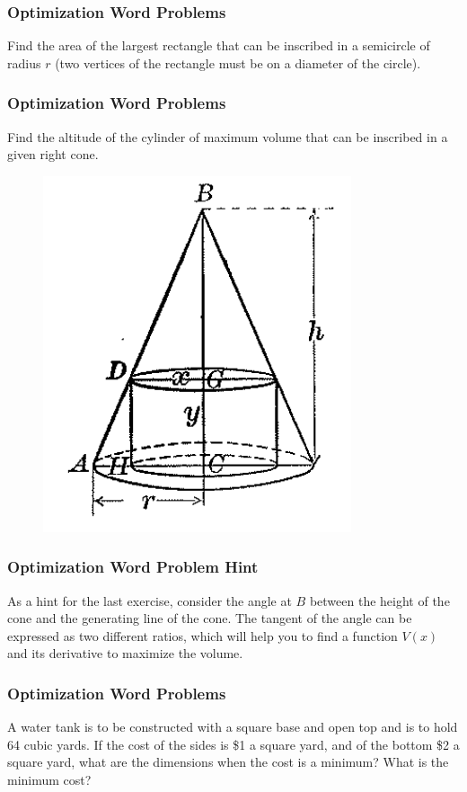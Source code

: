 \documentclass[xcolor=dvipsnames]{beamer}
\begin{document}
\begin{frame}
  \frametitle{Optimization Word Problems}
{\ubung} Find the area of the largest rectangle that can be inscribed
in a semicircle of radius $r$ (two vertices of the rectangle must be
on a diameter of the circle).
\end{frame}

\begin{frame}
  \frametitle{Optimization Word Problems}
{\ubung} Find the altitude of the cylinder of maximum volume that can
be inscribed in a given right cone.
  \begin{figure}[h]
    \includegraphics[scale=.3]{./diagrams/optcone.png}
  \end{figure}
\end{frame}

\begin{frame}
  \frametitle{Optimization Word Problem Hint}
  As a hint for the last exercise, consider the angle at $B$ between
  the height of the cone and the generating line of the cone. The
  tangent of the angle can be expressed as two different ratios, which
  will help you to find a function $V(x)$ and its derivative to
  maximize the volume.
\end{frame}

\begin{frame}
  \frametitle{Optimization Word Problems}
  {\ubung} A water tank is to be constructed with a square base and
  open top and is to hold 64 cubic yards. If the cost of the sides is
  \$1 a square yard, and of the bottom \$2 a square yard, what are the
  dimensions when the cost is a minimum? What is the minimum cost?
\end{frame}
\end{document}
